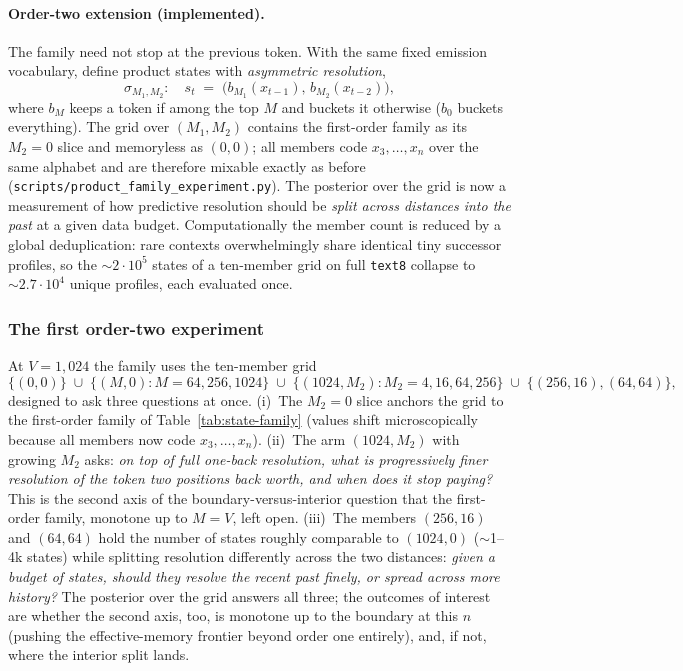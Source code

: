 \documentclass[11pt]{article}
\begin{document}
\paragraph{Order-two extension (implemented).}
The family need not stop at the previous token.  With the same fixed
emission vocabulary, define product states with \emph{asymmetric
resolution},
\[
  \sigma_{M_1,M_2}:\quad
  s_t \;=\; \bigl(b_{M_1}(x_{t-1}),\, b_{M_2}(x_{t-2})\bigr),
\]
where $b_M$ keeps a token if among the top $M$ and buckets it otherwise
($b_0$ buckets everything).  The grid over $(M_1, M_2)$ contains the
first-order family as its $M_2=0$ slice and memoryless as $(0,0)$; all
members code $x_3,\dots,x_n$ over the same alphabet and are therefore
mixable exactly as before
(\texttt{scripts/product\_family\_experiment.py}).  The posterior over
the grid is now a measurement of how predictive resolution should be
\emph{split across distances into the past} at a given data budget.
Computationally the member count is reduced by a global deduplication:
rare contexts overwhelmingly share identical tiny successor profiles, so
the $\sim 2\cdot 10^5$ states of a ten-member grid on full \texttt{text8}
collapse to $\sim 2.7\cdot 10^4$ unique profiles, each evaluated once.

\subsubsection*{The first order-two experiment}
At $V=1{,}024$ the family uses the
ten-member grid
\[
  \{(0,0)\} \;\cup\; \{(M,0): M = 64, 256, 1024\}
  \;\cup\; \{(1024, M_2): M_2 = 4, 16, 64, 256\}
  \;\cup\; \{(256,16), (64,64)\},
\]
designed to ask three questions at once.  (i)~The $M_2=0$ slice anchors
the grid to the first-order family of Table~\ref{tab:state-family}
(values shift microscopically because all members now code
$x_3,\dots,x_n$).  (ii)~The arm $(1024, M_2)$ with growing $M_2$ asks:
\emph{on top of full one-back resolution, what is progressively finer
resolution of the token two positions back worth, and when does it stop
paying?}
This is the second axis of the boundary-versus-interior question that
the first-order family, monotone up to $M=V$, left open.
(iii)~The members $(256,16)$ and $(64,64)$ hold the number of states
roughly comparable to $(1024,0)$ ($\sim$1--4k states) while splitting
resolution differently across the two distances: \emph{given a budget of
states, should they resolve the recent past finely, or spread across
more history?}  The posterior over the grid answers all three; the
outcomes of interest are whether the second axis, too, is monotone up to
the boundary at this $n$ (pushing the effective-memory frontier beyond
order one entirely), and, if not, where the interior split lands.
\end{document}

